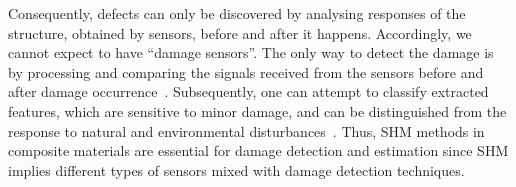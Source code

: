 Consequently, defects can only be discovered by analysing responses of the structure, obtained by sensors, before and after it happens.
Accordingly, we cannot expect to have “damage sensors”.
The only way to detect the damage is by processing and comparing the signals received from the sensors before and after damage occurrence~\cite{s18041094}. 
Subsequently, one can attempt to classify extracted features, which are sensitive to minor damage, and can be distinguished from the response to natural and environmental disturbances~\cite{s18041094}. 
Thus, SHM  methods in composite materials are essential for damage detection and estimation since SHM implies different types of sensors mixed with damage detection techniques. 
